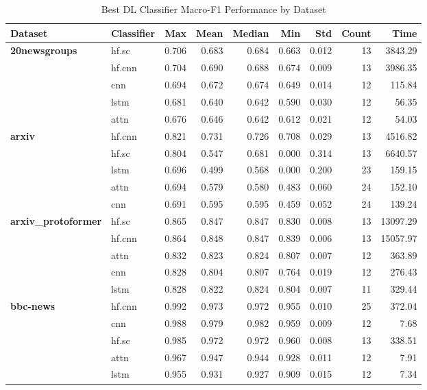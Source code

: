 \documentclass[final]{clv2025-revised}
\begin{document}
\begin{table}[h!]
\centering
\scriptsize
\caption{Best DL Classifier Macro-F1 Performance by Dataset}
\label{tab:dl_classifier_macro_f1}
\begin{tabular}{@{}p{2cm}p{1.2cm}rrrrrrr@{}}
\toprule
\textbf{Dataset} & \textbf{Classifier} & \textbf{Max} & \textbf{Mean} & \textbf{Median} & \textbf{Min} & \textbf{Std} & \textbf{Count} & \textbf{Time} \\
\midrule
\textbf{20newsgroups} & hf.sc & 0.706 & 0.683 & 0.684 & 0.663 & 0.012 & 13 & 3843.29 \\
 & hf.cnn & 0.704 & 0.690 & 0.688 & 0.674 & 0.009 & 13 & 3986.35 \\
 & cnn & 0.694 & 0.672 & 0.674 & 0.649 & 0.014 & 12 & 115.84 \\
 & lstm & 0.681 & 0.640 & 0.642 & 0.590 & 0.030 & 12 & 56.35 \\
 & attn & 0.676 & 0.646 & 0.642 & 0.612 & 0.021 & 12 & 54.03 \\
\midrule
\textbf{arxiv} & hf.cnn & 0.821 & 0.731 & 0.726 & 0.708 & 0.029 & 13 & 4516.82 \\
 & hf.sc & 0.804 & 0.547 & 0.681 & 0.000 & 0.314 & 13 & 6640.57 \\
 & lstm & 0.696 & 0.499 & 0.568 & 0.000 & 0.200 & 23 & 159.15 \\
 & attn & 0.694 & 0.579 & 0.580 & 0.483 & 0.060 & 24 & 152.10 \\
 & cnn & 0.691 & 0.595 & 0.595 & 0.459 & 0.052 & 24 & 139.24 \\
\midrule
\textbf{arxiv\_protoformer} & hf.sc & 0.865 & 0.847 & 0.847 & 0.830 & 0.008 & 13 & 13097.29 \\
 & hf.cnn & 0.864 & 0.848 & 0.847 & 0.839 & 0.006 & 13 & 15057.97 \\
 & attn & 0.832 & 0.823 & 0.824 & 0.807 & 0.007 & 12 & 363.89 \\
 & cnn & 0.828 & 0.804 & 0.807 & 0.764 & 0.019 & 12 & 276.43 \\
 & lstm & 0.828 & 0.822 & 0.824 & 0.804 & 0.007 & 11 & 329.44 \\
\midrule
\textbf{bbc-news} & hf.cnn & 0.992 & 0.973 & 0.972 & 0.955 & 0.010 & 25 & 372.04 \\
 & cnn & 0.988 & 0.979 & 0.982 & 0.959 & 0.009 & 12 & 7.68 \\
 & hf.sc & 0.985 & 0.972 & 0.972 & 0.960 & 0.008 & 13 & 338.51 \\
 & attn & 0.967 & 0.947 & 0.944 & 0.928 & 0.011 & 12 & 7.91 \\
 & lstm & 0.955 & 0.931 & 0.927 & 0.909 & 0.015 & 12 & 7.34 \\

\end{tabular}
\end{table}
\end{document}
